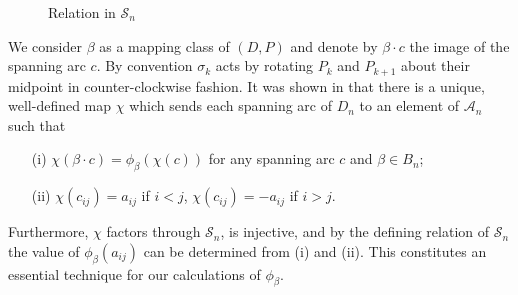 \documentclass[11pt]{amsart}
\def\A{{\mathcal A}}
\def\s{{\sigma}}
\theoremstyle{definition}
\begin{document}
  \begin{figure}[ht]
\caption{Relation in $\mathscr S_n$}
\label{FigRelnPathAlg}
  \end{figure}

We consider $\beta$ as a mapping class of $(D,P)$ and denote by $\beta\cdot c$ the image of the spanning arc $c$. By convention $\s_k$ acts by rotating $P_k$ and $P_{k+1}$ about their midpoint in counter-clockwise fashion. It was shown in \cite[Section 2]{Ng05b} that there is a unique, well-defined map $\chi$ which sends each spanning arc of $D_n$ to an element of $\A_n$ such that 
    \begin{itemize}
      \item[(i)] $\chi(\beta\cdot c) = \phi_{\beta}(\chi(c))$ for any spanning arc $c$ and $\beta\in B_n$;
      \item[(ii)] $\chi(c_{ij})=a_{ij}$ if $i<j$, $\chi(c_{ij})=-a_{ij}$ if $i>j$.
    \end{itemize}
Furthermore, $\chi$ factors through $\mathscr S_n$, is injective, and by the defining relation of $\mathscr S_n$ the value of $\phi_{\beta}(a_{ij})$ can be determined from (i) and (ii). This constitutes an essential technique for our calculations of $\phi_\beta$.
\end{document}
